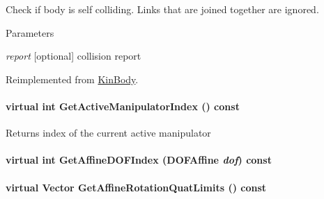 Check if body is self colliding. Links that are joined together are ignored. 


\begin{DoxyParams}{Parameters}
\item[{\em report}]\mbox{[}optional\mbox{]} collision report \end{DoxyParams}


Reimplemented from \hyperlink{classOpenRAVE_1_1KinBody_a3d555222cf7b02d592a0a31cef5d479d}{KinBody}.

\hypertarget{classOpenRAVE_1_1RobotBase_a1b663dc6bca08704a562fdc74e25dfd0}{
\paragraph[{GetActiveManipulatorIndex}]{\setlength{\rightskip}{0pt plus 5cm}virtual int GetActiveManipulatorIndex () const}\hfill}
\label{classOpenRAVE_1_1RobotBase_a1b663dc6bca08704a562fdc74e25dfd0}
\begin{DoxyReturn}{Returns}
index of the current active manipulator 
\end{DoxyReturn}
\hypertarget{classOpenRAVE_1_1RobotBase_a7cfd3a308f74598a3a33a5010137c632}{
\paragraph[{GetAffineDOFIndex}]{\setlength{\rightskip}{0pt plus 5cm}virtual int GetAffineDOFIndex ({\bf DOFAffine} {\em dof}) const}\hfill}
\label{classOpenRAVE_1_1RobotBase_a7cfd3a308f74598a3a33a5010137c632}
\hypertarget{classOpenRAVE_1_1RobotBase_ab4bb2e38267520019e902a1a5d4abbd3}{
\paragraph[{GetAffineRotationQuatLimits}]{\setlength{\rightskip}{0pt plus 5cm}virtual Vector GetAffineRotationQuatLimits () const}\hfill}
\label{classOpenRAVE_1_1RobotBase_ab4bb2e38267520019e902a1a5d4abbd3}


